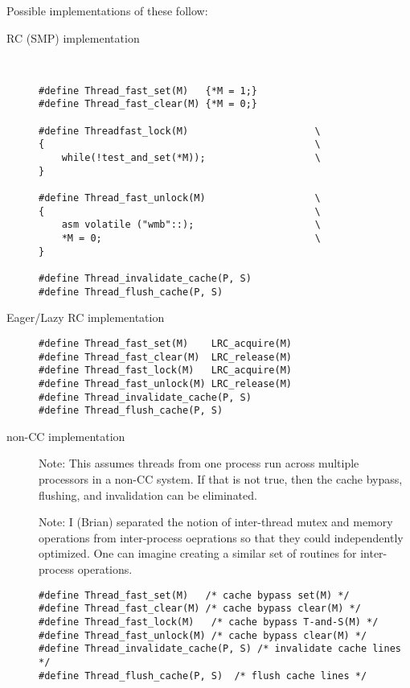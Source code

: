 Possible implementations of these follow:
\begin{description}
\item[RC (SMP) implementation]\\

\begin{verbatim}
#define Thread_fast_set(M)   {*M = 1;}
#define Thread_fast_clear(M) {*M = 0;}

#define Threadfast_lock(M)                      \
{                                               \
    while(!test_and_set(*M));                   \
}

#define Thread_fast_unlock(M)                   \
{                                               \
    asm volatile ("wmb"::);                     \
    *M = 0;                                     \
}

#define Thread_invalidate_cache(P, S)
#define Thread_flush_cache(P, S)
\end{verbatim}

\item[Eager/Lazy RC implementation]

\begin{verbatim}
#define Thread_fast_set(M)    LRC_acquire(M)
#define Thread_fast_clear(M)  LRC_release(M)
#define Thread_fast_lock(M)   LRC_acquire(M)
#define Thread_fast_unlock(M) LRC_release(M)
#define Thread_invalidate_cache(P, S)
#define Thread_flush_cache(P, S)
\end{verbatim}

\item[non-CC implementation]

Note: This assumes threads from one process run across multiple
processors in a non-CC system.  If that is not true, then the cache
bypass, flushing, and invalidation can be eliminated.

Note: I (Brian) separated the notion of inter-thread mutex and memory
operations 
from inter-process oeprations so that they could independently
optimized.  One can  imagine creating a similar set of routines for
inter-process operations.

\begin{verbatim}
#define Thread_fast_set(M)   /* cache bypass set(M) */
#define Thread_fast_clear(M) /* cache bypass clear(M) */
#define Thread_fast_lock(M)   /* cache bypass T-and-S(M) */
#define Thread_fast_unlock(M) /* cache bypass clear(M) */
#define Thread_invalidate_cache(P, S) /* invalidate cache lines */
#define Thread_flush_cache(P, S)  /* flush cache lines */
\end{verbatim}

\end{description}

